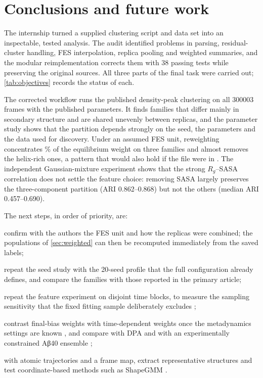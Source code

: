 \chapter{Conclusions and future work}
\label{ch:conclusions}
The internship turned a supplied clustering script and data set into an inspectable, tested analysis. The audit identified problems in parsing, residual-cluster handling, FES interpolation, replica pooling and weighted summaries, and the modular reimplementation corrects them with 38 passing tests while preserving the original sources. All three parts of the final task were carried out; \cref{tab:objectives} records the status of each.

The corrected workflow runs the published density-peak clustering on all \num{300003} frames with the published parameters. It finds \DPCFamilies{} families that differ mainly in secondary structure and are shared unevenly between replicas, and the parameter study shows that the partition depends strongly on the seed, the parameters and the data used for discovery. Under an assumed \kJmol{} FES unit, reweighting concentrates \WTopThree\% of the equilibrium weight on three families and almost removes the helix-rich ones, a pattern that would also hold if the file were in \kcalmol{}. The independent Gaussian-mixture experiment shows that the strong $R_g$--SASA correlation does not settle the feature choice: removing SASA largely preserves the three-component partition (ARI 0.862--0.868) but not the others (median ARI 0.457--0.690).

The next steps, in order of priority, are:
\begin{protocolsteps}
\item confirm with the authors the FES unit and how the replicas were combined; the populations of \cref{sec:weighted} can then be recomputed immediately from the saved labels;
\item repeat the seed study with the 20-seed profile that the full configuration already defines, and compare the families with those reported in the primary article;
\item repeat the feature experiment on disjoint time blocks, to measure the sampling sensitivity that the fixed fitting sample deliberately excludes \autocite{grossfield2019};
\item contrast final-bias weights with time-dependent  weights once the metadynamics settings are known \autocite{tiwary2015,bonomi2009}, and compare with DPA \autocite{derrico2021} and with an experimentally constrained Aβ40 ensemble \autocite{borthakur2025};
\item with atomic trajectories and a frame map, extract representative structures and test coordinate-based methods such as ShapeGMM \autocite{michaud2011,sasmal2024}.
\end{protocolsteps}
